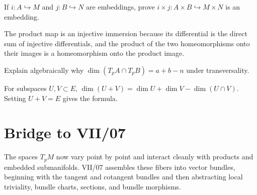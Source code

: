 \begin{problem}\label{prob:vii06-ch04}
If \(i:A\hookrightarrow M\) and \(j:B\hookrightarrow N\) are embeddings, prove \(i\times j:A\times B\hookrightarrow M\times N\) is an embedding.
\end{problem}
\begin{solution}
The product map is an injective immersion because its differential is the direct sum of injective differentials, and the product of the two homeomorphisms onto their images is a homeomorphism onto the product image.
\end{solution}

\begin{problem}\label{prob:vii06-ch05}
Explain algebraically why \(\dim(T_pA\cap T_pB)=a+b-n\) under transversality.
\end{problem}
\begin{solution}
For subspaces \(U,V\subset E\), \(\dim(U+V)=\dim U+\dim V-\dim(U\cap V)\). Setting \(U+V=E\) gives the formula.
\end{solution}

\section*{Bridge to VII/07}
The spaces \(T_pM\) now vary point by point and interact cleanly with products and embedded submanifolds. VII/07 assembles these fibers into vector bundles, beginning with the tangent and cotangent bundles and then abstracting local triviality, bundle charts, sections, and bundle morphisms.
